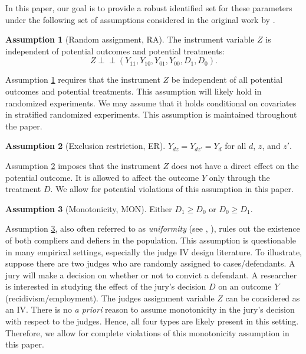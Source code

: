 \documentclass[12pt]{article}
\theoremstyle{plain}
\theoremstyle{definition}
\newtheorem{assumption}{Assumption}%
\theoremstyle{remark}
\newcommand{\indep}{\perp \!\!\! \perp}
\begin{document}
In this paper, our goal is to provide a robust identified set for these parameters under the following set of assumptions considered in the original work by \cite{imbens1994identification}.
\begin{assumption}[Random assignment, RA] \label{ass:RA}
    The instrument variable $Z$ is independent of potential outcomes and potential treatments:
    \begin{equation*}
        Z \indep (Y_{11}, Y_{10}, Y_{01}, Y_{00}, D_1, D_0).
    \end{equation*}
\end{assumption}
Assumption \ref{ass:RA} requires that the instrument $Z$ be independent of all potential outcomes and potential treatments. This assumption will likely hold in randomized experiments. We may assume that it holds conditional on covariates in stratified randomized experiments. This assumption is maintained throughout the paper. 


\begin{assumption}[Exclusion restriction, ER] \label{ass:er}
    $Y_{dz}=Y_{dz'}=Y_d$ for all $d$, $z$, and $z'$.
\end{assumption}
Assumption \ref{ass:er} imposes that the instrument $Z$ does not have a direct effect on the potential outcome. It is allowed to affect the outcome $Y$ only through the treatment $D$. We allow for potential violations of this assumption in this paper. 

\begin{assumption}[Monotonicity, MON] \label{ass:mon}
    Either $D_1 \geq D_0$ or $D_0 \geq D_1$.
\end{assumption}
Assumption \ref{ass:mon}, also often referred to as \textit{uniformity} (see \citeauthor{heckman2018unordered}, \citeyear{heckman2018unordered}), rules out the existence of both compliers and defiers in the population. This assumption is questionable in many empirical settings, especially the judge IV design literature. 
To illustrate, suppose there are two judges who are randomly assigned to cases/defendants. A jury will make a decision on whether or not to convict a defendant. A researcher is interested in studying the effect of the jury's decision $D$ on an outcome $Y$ (recidivism/employment). The judges assignment variable $Z$ can be considered as an IV. There is no \textit{a priori} reason to assume monotonicity in the jury's decision with respect to the judges. Hence, all four types are likely present in this setting.  
Therefore, we allow for complete violations of this monotonicity assumption in this paper. 
\end{document}
